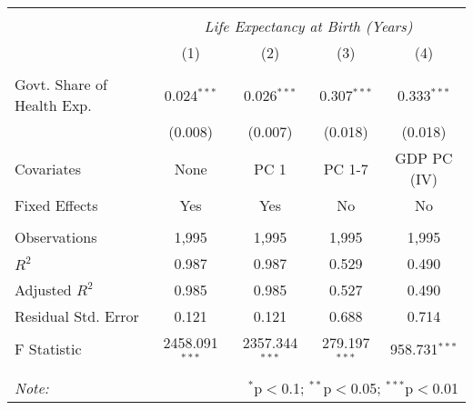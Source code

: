 \begin{table}[!htbp] \centering
\begin{tabular}{@{\extracolsep{5pt}}lcccc}
\\[-1.8ex]\hline
\hline \\[-1.8ex]
& \multicolumn{4}{c}{\textit{Life Expectancy at Birth (Years)}} \
\cr \
\\[-1.8ex] & (1) & (2) & (3) & (4) \\
\hline \\[-1.8ex]
 Govt. Share of Health Exp. & 0.024$^{***}$ & 0.026$^{***}$ & 0.307$^{***}$ & 0.333$^{***}$ \\
  & (0.008) & (0.007) & (0.018) & (0.018) \\
 Covariates & None & PC 1 & PC 1-7 & GDP PC (IV) \\
 Fixed Effects & Yes & Yes & No & No \\
\hline \\[-1.8ex]
 Observations & 1,995 & 1,995 & 1,995 & 1,995 \\
 $R^2$ & 0.987 & 0.987 & 0.529 & 0.490 \\
 Adjusted $R^2$ & 0.985 & 0.985 & 0.527 & 0.490 \\
 Residual Std. Error & 0.121 & 0.121 & 0.688 & 0.714  \\
 F Statistic & 2458.091$^{***}$  & 2357.344$^{***}$  & 279.197$^{***}$  & 958.731$^{***}$  \\
\hline
\hline \\[-1.8ex]
\textit{Note:} & \multicolumn{4}{r}{$^{*}$p$<$0.1; $^{**}$p$<$0.05; $^{***}$p$<$0.01} \\
\end{tabular}
\end{table}